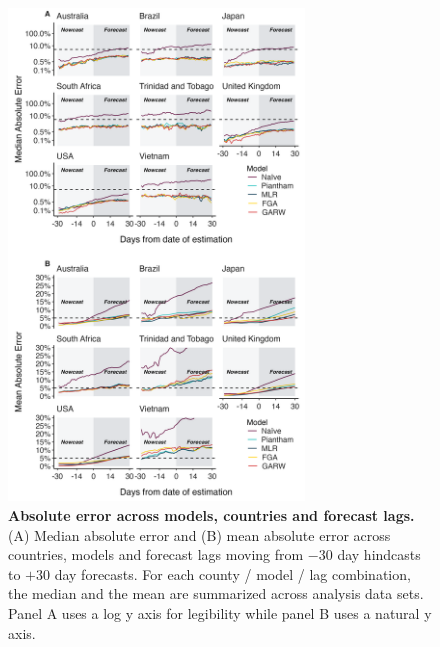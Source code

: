 \begin{figure}[h!]
	\centering
	\includegraphics[width=0.70\textwidth]{figures/model_comp_A.png}
	\caption[\textbf{Absolute error across models, countries and forecast lags.}]{
	\textbf{Absolute error across models, countries and forecast lags.}
	(A) Median absolute error and (B) mean absolute error across countries, models and forecast lags moving from $-30$ day hindcasts to $+30$ day forecasts.
	For each county / model / lag combination, the median and the mean are summarized across analysis data sets.
	Panel A uses a log y axis for legibility while panel B uses a natural y axis.
	}
	\label{fig:Fig2}
\end{figure}

